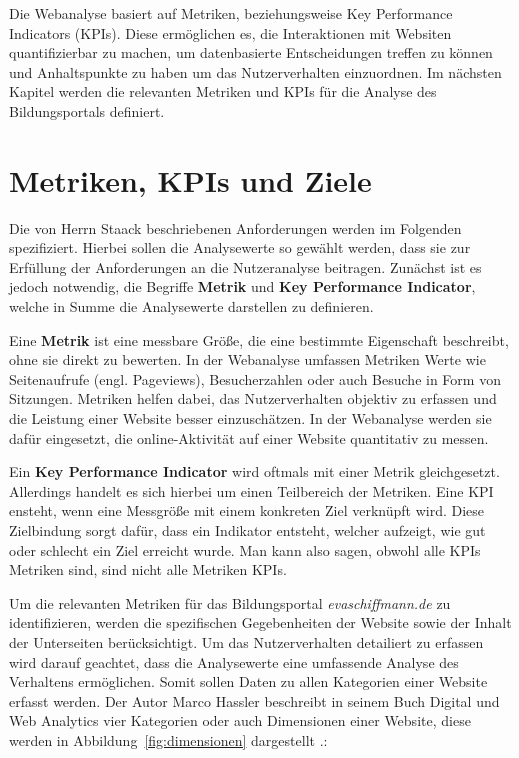 Die Webanalyse basiert auf Metriken, beziehungsweise Key Performance Indicators (KPIs). Diese ermöglichen es, die Interaktionen mit Websiten quantifizierbar zu machen, um datenbasierte Entscheidungen treffen zu können und Anhaltspunkte zu haben um das Nutzerverhalten einzuordnen. Im nächsten Kapitel werden die relevanten Metriken und KPIs für die Analyse des Bildungsportals definiert.

\section{Metriken, KPIs und Ziele} %
\label{sec:kpis}
Die von Herrn Staack beschriebenen Anforderungen werden im Folgenden spezifiziert. Hierbei sollen die Analysewerte so gewählt werden, dass sie zur Erfüllung der Anforderungen an die Nutzeranalyse beitragen. Zunächst ist es jedoch notwendig, die Begriffe \textbf{\glqq Metrik\grqq{}} und \textbf{\glqq Key Performance Indicator\grqq{}}, welche in Summe die Analysewerte darstellen zu definieren.

Eine \textbf{Metrik} ist eine messbare Größe, die eine bestimmte Eigenschaft beschreibt, ohne sie direkt zu bewerten. In der Webanalyse umfassen Metriken Werte wie Seitenaufrufe (engl. Pageviews), Besucherzahlen oder auch Besuche in Form von Sitzungen. Metriken helfen dabei, das Nutzerverhalten objektiv zu erfassen und die Leistung einer Website besser einzuschätzen. In der Webanalyse werden sie dafür eingesetzt, die online-Aktivität auf einer Website quantitativ zu messen. \parencite[Kap.5.1]{Hassler2019} \parencite[S.26]{Dykes2014}

Ein \textbf{Key Performance Indicator} wird oftmals mit einer Metrik gleichgesetzt. Allerdings handelt es sich hierbei um einen Teilbereich der Metriken. Eine KPI ensteht, wenn eine Messgröße mit einem konkreten Ziel verknüpft wird. Diese Zielbindung sorgt dafür, dass ein Indikator entsteht, welcher aufzeigt, wie gut oder schlecht ein Ziel erreicht wurde. Man kann also sagen, obwohl alle KPIs Metriken sind, sind nicht alle Metriken KPIs. \parencite[S.9-13]{Lammenett2019} \parencite[S.46]{Dykes2014}

Um die relevanten Metriken für das Bildungsportal \textit{evaschiffmann.de} zu identifizieren, werden die spezifischen Gegebenheiten der Website sowie der Inhalt der Unterseiten berücksichtigt. Um das Nutzerverhalten detailiert zu erfassen wird darauf geachtet, dass die Analysewerte eine umfassende Analyse des Verhaltens ermöglichen. Somit sollen Daten zu allen Kategorien einer Website erfasst werden. Der Autor Marco Hassler beschreibt in seinem Buch \glqq Digital und Web Analytics\grqq{} vier Kategorien oder auch Dimensionen einer Website, diese werden in Abbildung~\ref{fig:dimensionen} dargestellt \parencite[Kap.5.7]{Hassler2019}.: 

